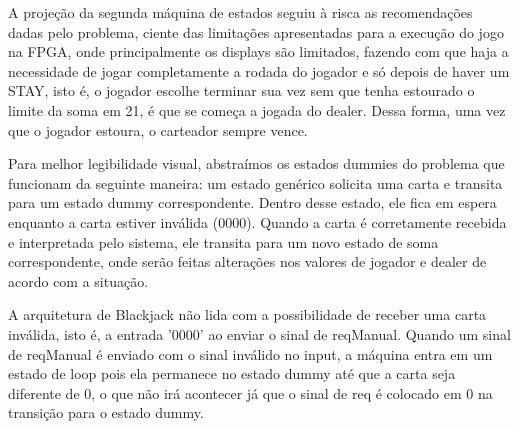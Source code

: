 \documentclass[oneside]{uffstex}
\begin{document}
A projeção da segunda máquina de estados seguiu à risca as recomendações dadas pelo problema, ciente das limitações apresentadas para a execução do jogo na FPGA, onde principalmente os displays são limitados, fazendo com que haja a necessidade de jogar completamente a rodada do jogador e só depois de haver um STAY, isto é, o jogador escolhe terminar sua vez sem que tenha estourado o limite da soma em 21, é que se começa a jogada do dealer. Dessa forma, uma vez que o jogador estoura, o carteador sempre vence. 

Para melhor legibilidade visual, abstraímos os estados dummies do problema que funcionam da seguinte maneira: um estado genérico solicita uma carta e transita para um estado dummy correspondente. Dentro desse estado, ele fica em espera enquanto a carta estiver inválida (0000). Quando a carta é corretamente recebida e interpretada pelo sistema, ele transita para um novo estado de soma correspondente, onde serão feitas alterações nos valores de jogador e dealer de acordo com a situação.

A arquitetura de Blackjack não lida com a possibilidade de receber uma carta inválida, isto é, a entrada '0000' ao enviar o sinal de reqManual. Quando um sinal de reqManual é enviado com o sinal inválido no input, a máquina entra em um estado de loop pois ela permanece no estado dummy até que a carta seja diferente de 0, o que não irá acontecer já que o sinal de req é colocado em 0 na transição para o estado dummy.
\end{document}
